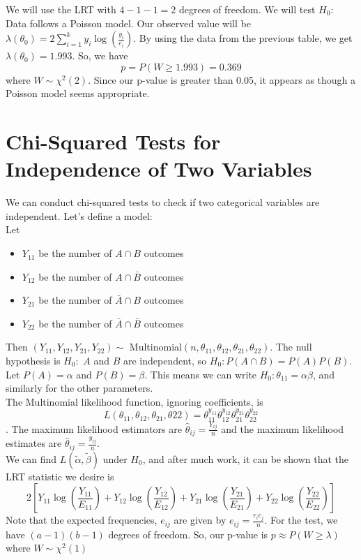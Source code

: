 \documentclass[12pt]{article}
\begin{document}
We will use the LRT with $4-1-1=2$ degrees of freedom. We will test $H_0:$ Data follows a Poisson model. Our observed value will be $\lambda(\theta_0)=2\sum\limits_{i=1}^ky_i\log\left(\frac{y_i}{e_i}\right)$.
By using the data from the previous table, we get $\lambda(\theta_0)=1.993$. So, we have \[p=P(W\geq 1.993)=0.369\] where $W\sim \chi^2(2)$. Since our p-value is greater than 0.05, it appears as though a Poisson model seems appropriate.

\section{Chi-Squared Tests for Independence of Two Variables}
We can conduct chi-squared tests to check if two categorical variables are independent. Let's define a model:\\
Let
\begin{itemize}
    \item $Y_{11}$ be the number of $A\cap B$ outcomes
    \item $Y_{12}$ be the number of $A\cap\bar B$ outcomes 
    \item $Y_{21}$ be the number of $\bar A\cap B$ outcomes 
    \item $Y_{22}$ be the number of $\bar A\cap\bar B$ outcomes
\end{itemize}
Then $(Y_{11}, Y_{12}, Y_{21}, Y_{22})\sim$ Multinomial$(n,\theta_{11},\theta_{12},\theta_{21},\theta_{22})$. The null hypothesis is $H_0:$ $A$ and $B$ are independent, so $H_0:P(A\cap B)=P(A)P(B)$. Let $P(A)=\alpha$ and $P(B)=\beta$. This means we can write $H_0:\theta_{11}=\alpha\beta$, and similarly for the other parameters.\\
The Multinomial likelihood function, ignoring coefficients, is \[L(\theta_{11},\theta_{12},\theta_{21},\theta{22})=\theta_{11}^{y_{11}}\theta_{12}^{y_{12}}\theta_{21}^{y_{21}}\theta_{22}^{y_{22}}\].
The maximum likelihood estimators are $\hat\theta_{ij}=\frac{Y_{ij}}{n}$ and the maximum likelihood estimates are $\hat\theta_{ij}=\frac{y_{ij}}{n}$.\\
We can find $L(\tilde\alpha,\tilde\beta)$ under $H_0$, and after much work, it can be shown that the LRT statistic we desire is \[2[Y_{11}\log\left(\frac{Y_{11}}{E_{11}}\right)+Y_{12}\log\left(\frac{Y_{12}}{E_{12}}\right)+Y_{21}\log\left(\frac{Y_{21}}{E_{21}}\right)+Y_{22}\log\left(\frac{Y_{22}}{E_{22}}\right)]\]
Note that the expected frequencies, $e_{ij}$ are given by $e_{ij}=\frac{r_ic_j}{n}$. For the test, we have $(a-1)(b-1)$ degrees of freedom. So, our p-value is $p\approx P(W\geq \lambda)$ where $W\sim \chi^2(1)$
\end{document}
